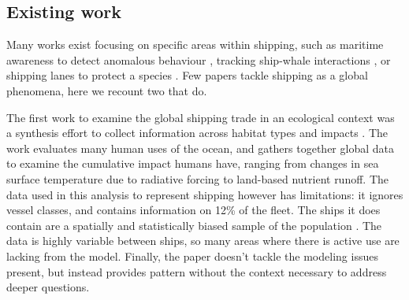 \subsection{Existing work}

Many works exist focusing on specific areas within shipping, such as maritime awareness to detect anomalous behaviour \cite{Tun2007}, tracking ship-whale interactions \cite{jensen2004large}, or shipping lanes to protect a species \cite{Lagueux2011,Mckenna2012a}.  Few papers tackle shipping as a global phenomena, here we recount two that do.

The first work %
to examine the global shipping trade in an ecological context was a synthesis effort to collect information across habitat types and impacts \citep{Halpern2008}. The work evaluates many human uses of the ocean, and gathers together global data to examine the cumulative impact humans have, ranging from changes in sea surface temperature due to radiative forcing to land-based nutrient runoff. The data used in this analysis to represent shipping however has limitations: it ignores vessel classes, %
 and contains information on 12\% of the fleet. The ships it does contain are a spatially and statistically biased sample of the population \citep{Wang2007}. The data is highly variable between ships, so many areas where there is active use are lacking from the model. Finally, the paper doesn't tackle the modeling issues present, but instead provides pattern without the context necessary to address deeper questions. %


